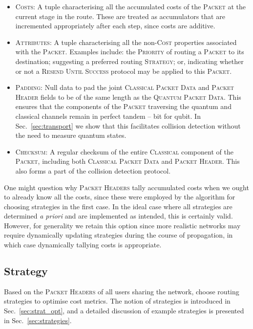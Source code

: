 \documentclass[aps,rmp,twocolumn,amsmath,amssymb,nofootinbib,superscriptaddress,longbibliography,floatfix,table-of-contents,eqsecnum]{revtex4-1}
\begin{document}
\begin{itemize}
    \item \textsc{Costs}: A tuple characterising all the accumulated costs of the \textsc{Packet} at the current stage in the route. These are treated as accumulators that are incremented appropriately after each step, since costs are additive.
    \item \textsc{Attributes}: A tuple characterising all the non-\textsc{Cost} properties associated with the \textsc{Packet}. Examples include: the \textsc{Priority} of routing a \textsc{Packet} to its destination; suggesting a preferred routing \textsc{Strategy}; or, indicating whether or not a \textsc{Resend Until Success} protocol may be applied to this \textsc{Packet}.
    \item \textsc{Padding}: Null data to pad the joint \textsc{Classical Packet Data} and \textsc{Packet Header} fields to be of the same length as the \textsc{Quantum Packet Data}. This ensures that the components of the \textsc{Packet} traversing the quantum and classical channels remain in perfect tandem -- bit for qubit. In Sec.~\ref{sec:transport} we show that this facilitates collision detection without the need to measure quantum states.
    \item \textsc{Checksum}: A regular checksum of the entire \textsc{Classical} component of the \textsc{Packet}, including both \textsc{Classical Packet Data} and \textsc{Packet Header}. This also forms a part of the collision detection protocol.
\end{itemize}

One might question why \textsc{Packet Headers} tally accumulated costs when we ought to already know all the costs, since these were employed by the algorithm for choosing strategies in the first case. In the ideal case where all strategies are determined \textit{a priori} and are implemented as intended, this is certainly valid. However, for generality we retain this option since more realistic networks may require dynamically updating strategies during the course of propagation, in which case dynamically tallying costs is appropriate.

%
%

\subsection{Strategy} \label{sec:into_strat} 

Based on the \textsc{Packet Headers} of all users sharing the network, choose routing strategies to optimise cost metrics. The notion of strategies is introduced in Sec.~\ref{sec:strat_opt}, and a detailed discussion of example strategies is presented in Sec.~\ref{sec:strategies}.
\end{document}
